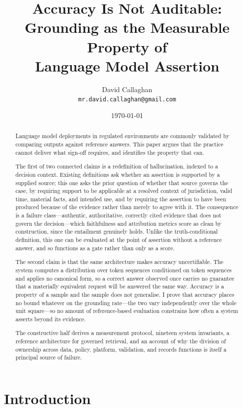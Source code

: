 \documentclass[11pt]{article}
\title{Accuracy Is Not Auditable:\\
       Grounding as the Measurable Property of\\
       Language Model Assertion}
\author{%
  David Callaghan\\
  \texttt{mr.david.callaghan@gmail.com}
}
\date{\today}
\theoremstyle{plain}
\theoremstyle{definition}
\begin{document}
\maketitle

\begin{abstract}
Language model deployments in regulated environments are commonly validated by
comparing outputs against reference answers. This paper argues that the practice cannot
deliver what sign-off requires, and identifies the property that can.

The first of two connected claims is a redefinition of hallucination, indexed to a
decision context. Existing definitions ask whether an assertion is supported by a
supplied source; this one asks the prior question of whether that source governs the
case, by requiring support to be applicable at a resolved context of jurisdiction, valid
time, material facts, and intended use, and by requiring the assertion to have been
produced because of the evidence rather than merely to agree with it. The consequence is
a failure class---authentic, authoritative, correctly cited evidence that does not govern
the decision---which faithfulness and attribution metrics score as clean by construction,
since the entailment genuinely holds. Unlike the truth-conditional definition, this one
can be evaluated at the point of assertion without a reference answer, and so functions as a
gate rather than only as a score.

The second claim is that the same architecture makes accuracy uncertifiable. The system
computes a distribution over token sequences conditioned on token sequences and applies
no canonical form, so a correct answer observed once carries no guarantee that a
materially equivalent request will be answered the same way. Accuracy is a property of a
sample and the sample does not generalise. I prove that accuracy places no bound whatever
on the grounding rate---the two vary independently over the whole unit square---so no
amount of reference-based evaluation constrains how often a system asserts beyond its
evidence.

The constructive half derives a measurement protocol, nineteen system invariants, a
reference architecture for governed retrieval, and an account of why the division of
ownership across data, policy, platform, validation, and records functions is itself a
principal source of failure.
\end{abstract}


\section{Introduction}
\label{sec:intro}
\end{document}

